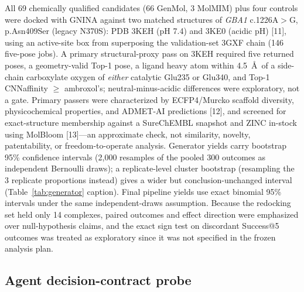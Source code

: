 \documentclass{article}
\begin{document}
All 69 chemically qualified candidates (66 GenMol, 3 MolMIM) plus four controls were docked with GNINA against two matched structures of \textit{GBA1} c.1226A$>$G, p.Asn409Ser (legacy N370S): PDB 3KEH (pH 7.4) and 3KE0 (acidic pH) [11], using an active-site box from superposing the validation-set 3GXF chain (146 five-pose jobs). A primary structural-proxy pass on 3KEH required five returned poses, a geometry-valid Top-1 pose, a ligand heavy atom within 4.5~\AA\ of a side-chain carboxylate oxygen of \emph{either} catalytic Glu235 or Glu340, and Top-1 CNNaffinity $\geq$ ambroxol's; neutral-minus-acidic differences were exploratory, not a gate. Primary passers were characterized by ECFP4/Murcko scaffold diversity, physicochemical properties, and ADMET-AI predictions [12], and screened for exact-structure membership against a SureChEMBL snapshot and ZINC in-stock using MolBloom [13]---an approximate check, not similarity, novelty, patentability, or freedom-to-operate analysis. Generator yields carry bootstrap 95\% confidence intervals (2{,}000 resamples of the pooled 300 outcomes as independent Bernoulli draws); a replicate-level cluster bootstrap (resampling the 3 replicate proportions instead) gives a wider but conclusion-unchanged interval (Table~\ref{tab:generator} caption). Final pipeline yields use exact binomial 95\% intervals under the same independent-draws assumption. Because the redocking set held only 14 complexes, paired outcomes and effect direction were emphasized over null-hypothesis claims, and the exact sign test on discordant Success@5 outcomes was treated as exploratory since it was not specified in the frozen analysis plan.

\subsection{Agent decision-contract probe}
\end{document}

